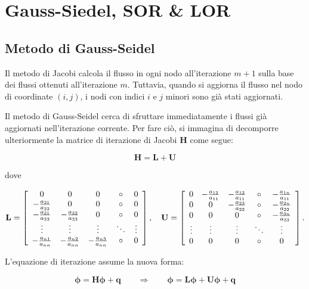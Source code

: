 \chapter{Gauss-Siedel, SOR \& LOR}


\section{Metodo di Gauss-Seidel}

Il metodo di Jacobi calcola il flusso in ogni nodo all'iterazione $m+1$ sulla base dei flussi ottenuti all'iterazione $m$. Tuttavia, quando si aggiorna il flusso nel nodo di coordinate $(i,j)$, i nodi con indici $i$ e $j$ minori sono già stati aggiornati.

Il metodo di Gauss-Seidel cerca di sfruttare immediatamente i flussi già aggiornati nell'iterazione corrente. Per fare ciò, si immagina di decomporre ulteriormente la matrice di iterazione di Jacobi $\mathbf{H}$ come segue:

\begin{equation*}
	\mathbf{H} = \mathbf{L} + \mathbf{U} \tag{1}
\end{equation*}

dove

\[
\mathbf{L} = \left[ \begin{array}{c c c c c}
	0 & 0 & 0 & \circ & 0 \\
	- \frac{a_{21}}{a_{22}} & 0 & 0 & \circ & 0 \\
	- \frac{a_{31}}{a_{33}} & - \frac{a_{32}}{a_{33}} & 0 & \circ & 0 \\
	\vdots & \vdots & \vdots & \ddots & \vdots \\
	- \frac{a_{n1}}{a_{nn}} & - \frac{a_{n2}}{a_{nn}} & - \frac{a_{n3}}{a_{nn}} & \circ & 0
\end{array} \right],
\quad
\mathbf{U} = \left[ \begin{array}{c c c c c}
	0 & - \frac{a_{12}}{a_{11}} & - \frac{a_{13}}{a_{11}} & \circ & - \frac{a_{1n}}{a_{11}} \\
	0 & 0 & - \frac{a_{23}}{a_{22}} & \circ & - \frac{a_{2n}}{a_{22}} \\
	0 & 0 & 0 & \circ & - \frac{a_{3n}}{a_{33}} \\
	\vdots & \vdots & \vdots & \ddots & \vdots \\
	0 & 0 & 0 & \circ & 0
\end{array} \right].
\]

L'equazione di iterazione assume la nuova forma:

\begin{equation*}
	\mathbf{\phi} = \mathbf{H} \mathbf{\phi} + \mathbf{q} 
	\qquad \Rightarrow \qquad \mathbf{\phi} = \mathbf{L} \mathbf{\phi} + \mathbf{U} \mathbf{\phi} + \mathbf{q} \tag{2}
\end{equation*}

